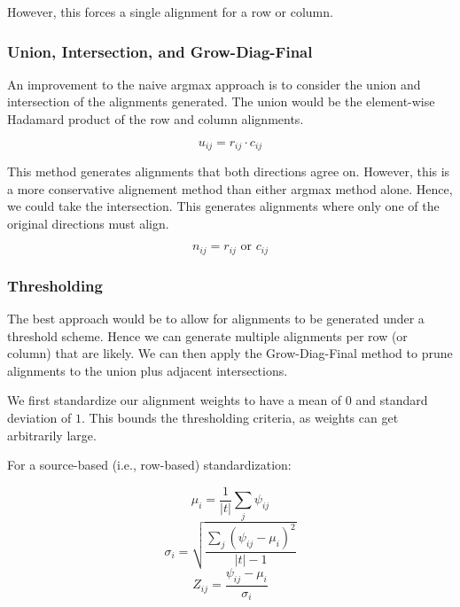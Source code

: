 \documentclass[twoside,twocolumn]{article}
\begin{document}
However, this forces a single alignment for a row or column.

\subsubsection{Union, Intersection, and Grow-Diag-Final}

An improvement to the naive argmax approach is to consider the union and
intersection of the alignments generated. The union would be the element-wise
Hadamard product of the row and column alignments.

\begin{equation}
  u_{ij} = r_{ij} \cdot c_{ij}
\end{equation}

This method generates alignments that both directions agree on. However, this
is a more conservative alignement method than either argmax method alone.
Hence, we could take the intersection. This generates alignments where only one
of the original directions must align.

\begin{equation}
  n_{ij} = r_{ij} \text{ or } c_{ij}
\end{equation}


\subsubsection{Thresholding}

The best approach would be to allow for alignments to be generated under a
threshold scheme. Hence we can generate multiple alignments per row (or column)
that are likely. We can then apply the Grow-Diag-Final method to prune
alignments to the union plus adjacent intersections.

We first standardize our alignment weights to have a mean of $0$ and standard
deviation of $1$. This bounds the thresholding criteria, as weights can get
arbitrarily large.

For a source-based (i.e., row-based) standardization:

\begin{equation}
  \mu_{i} = \frac{1}{|t|} \sum_j \psi_{ij}
\end{equation}
\begin{equation}
  \sigma_{i} = \sqrt{\frac{\sum_j \left( \psi_{ij} - \mu_i \right)^2}{|t|-1}}
\end{equation}
\begin{equation}
  Z_{ij} = \frac{\psi_{ij} - \mu_i}{\sigma_i}
\end{equation}
\end{document}
